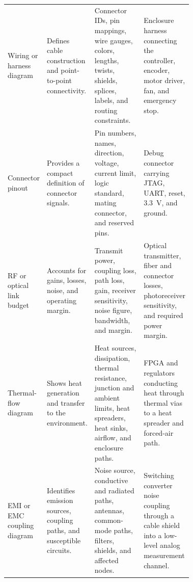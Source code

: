 \begin{singlespace}
\begin{longtable}{@{}L{0.17\linewidth} L{0.23\linewidth} L{0.32\linewidth} L{\tabcolsep\relax}@{}}
\addlinespace[3pt]
Wiring or harness diagram & Defines cable construction and point-to-point connectivity. & Connector IDs, pin mappings, wire gauges, colors, lengths, twists, shields, splices, labels, and routing constraints. & Enclosure harness connecting the controller, encoder, motor driver, fan, and emergency stop. \\
\addlinespace[3pt]
Connector pinout & Provides a compact definition of connector signals. & Pin numbers, names, direction, voltage, current limit, logic standard, mating connector, and reserved pins. & Debug connector carrying JTAG, UART, reset, 3.3~V, and ground. \\
\addlinespace[3pt]
RF or optical link budget & Accounts for gains, losses, noise, and operating margin. & Transmit power, coupling loss, path loss, gain, receiver sensitivity, noise figure, bandwidth, and margin. & Optical transmitter, fiber and connector losses, photoreceiver sensitivity, and required power margin. \\
\addlinespace[3pt]
Thermal-flow diagram & Shows heat generation and transfer to the environment. & Heat sources, dissipation, thermal resistance, junction and ambient limits, heat spreaders, heat sinks, airflow, and enclosure paths. & FPGA and regulators conducting heat through thermal vias to a heat spreader and forced-air path. \\
\addlinespace[3pt]
EMI or EMC coupling diagram & Identifies emission sources, coupling paths, and susceptible circuits. & Noise source, conductive and radiated paths, antennas, common-mode paths, filters, shields, and affected nodes. & Switching converter noise coupling through a cable shield into a low-level analog measurement channel. \\
\end{longtable}
\end{singlespace}


